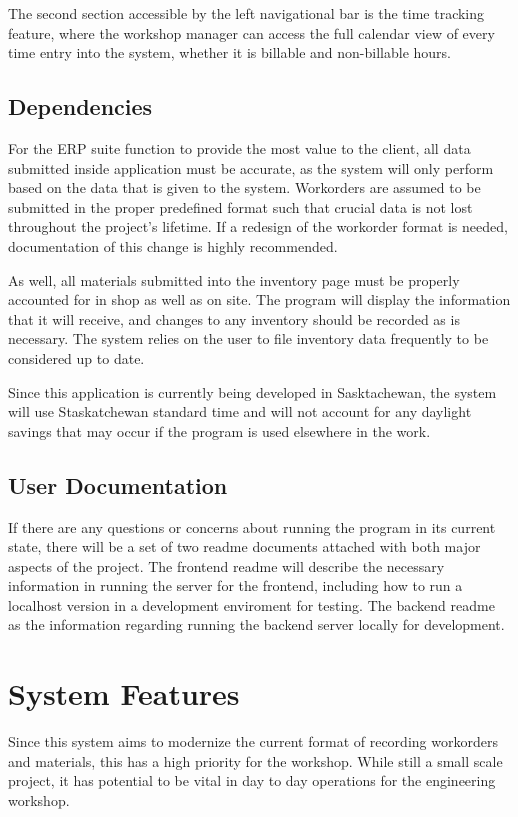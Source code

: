 {{{{{The second section accessible by the left navigational bar is the time tracking feature, where the workshop manager can access the full calendar view of every time entry into the system, whether it is billable and non-billable hours. 

\subsection{Dependencies}
For the ERP suite function to provide the most value to the client, all data submitted inside application must be accurate, as the system will only perform based on the data that is given to the system. Workorders are assumed to be submitted in the proper predefined format such that crucial data is not lost throughout the project's lifetime. If a redesign of the workorder format is needed, documentation of this change is highly recommended.
\newline
{\setlength{\parindent}{0cm}
 
As well, all materials submitted into the inventory page must be properly accounted for in shop as well as on site. The program will display the information that it will receive, and changes to any inventory should be recorded as is necessary. The system relies on the user to file inventory data frequently to be considered up to date. 
\newline
{\setlength{\parindent}{0cm}

Since this application is currently being  developed in Sasktachewan, the system will use Staskatchewan standard time and will not account for any daylight savings that may occur if the program is used elsewhere in the work.

\subsection{User Documentation}
If there are any questions or concerns about running the program in its current state, there will be a set of two readme documents attached with both major aspects of the project. The frontend readme will describe the necessary information in running the server for the frontend, including how to run a localhost version in a development enviroment for testing. The backend readme as the information regarding running the backend server locally for development.

\newpage 
\section{System Features}
Since this system aims to modernize the current format of recording workorders and materials, this has a high priority for the workshop. While still a small scale project, it has potential to be vital in day to day operations for the engineering workshop. 

}}}}}}}
